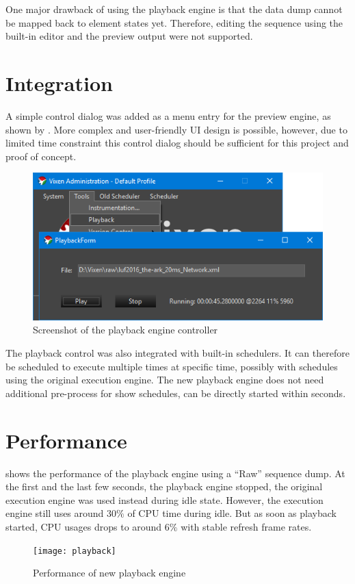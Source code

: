 One major drawback of using the playback engine is that the data dump cannot be mapped back to element states yet. Therefore, editing the sequence using the built-in editor and the preview output were not supported.

\section{Integration}

A simple control dialog was added as a menu entry for the preview engine, as shown by . More complex and user-friendly UI design is possible, however, due to limited time constraint this control dialog should be sufficient for this project and proof of concept.

\begin{figure}[t]
  \centering
  \includegraphics[width=0.8\columnwidth]{Figs/vixen_playback.png}
  \caption{Screenshot of the playback engine controller}
  \label{fig:vixen_playback}
\end{figure}

The playback control was also integrated with built-in schedulers. It can therefore be scheduled to execute multiple times at specific time, possibly with schedules using the original execution engine. The new playback engine does not need additional pre-process for show schedules, can be directly started within seconds.

\section{Performance}

 shows the performance of the playback engine using a ``Raw'' sequence dump. At the first and the last few seconds, the playback engine stopped, the original execution engine was used instead during idle state. However, the execution engine still uses around $30 \%$ of CPU time during idle. But as soon as playback started, CPU usages drops to around $6 \%$ with stable refresh frame rates.

\begin{figure}[t]
  \centering
  \texttt{[image: playback]}
  \caption{Performance of new playback engine}
  \label{fig:playback}
\end{figure}
